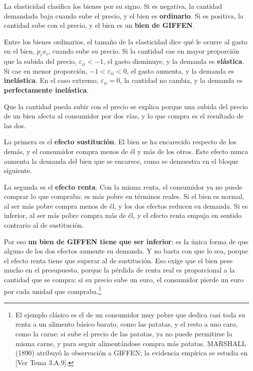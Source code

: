 \documentclass[10pt,a4paper]{article}
\newcommand{\authorfont}[1]{{\fontfamily{EBGaramond-TLF}\selectfont #1}}
\begin{document}
La elasticidad clasifica los bienes por su signo. Si es negativa, la cantidad demandada baja cuando sube el precio, y el bien es \textbf{ordinario}. Si es positiva, la cantidad sube con el precio, y el bien es un \textbf{bien de GIFFEN}.

Entre los bienes ordinarios, el tamaño de la elasticidad dice qué le ocurre al gasto en el bien, $p_ix_i$, cuando sube su precio. Si la cantidad cae en mayor proporción que la subida del precio, $\varepsilon_{ii}<-1$, el gasto disminuye, y la demanda es \textbf{elástica}. Si cae en menor proporción, $-1<\varepsilon_{ii}<0$, el gasto aumenta, y la demanda es \textbf{inelástica}. En el caso extremo, $\varepsilon_{ii}=0$, la cantidad no cambia, y la demanda es \textbf{perfectamente inelástica}.

Que la cantidad pueda subir con el precio se explica porque una subida del precio de un bien afecta al consumidor por dos vías, y lo que compra es el resultado de las dos.

La primera es el \textbf{efecto sustitución}. El bien se ha encarecido respecto de los demás, y el consumidor compra menos de él y más de los otros. Este efecto nunca aumenta la demanda del bien que se encarece, como se demuestra en el bloque siguiente.

La segunda es el \textbf{efecto renta}. Con la misma renta, el consumidor ya no puede comprar lo que compraba: es más pobre en términos reales. Si el bien es normal, al ser más pobre compra menos de él, y los dos efectos reducen su demanda. Si es inferior, al ser más pobre compra más de él, y el efecto renta empuja en sentido contrario al de sustitución.

Por eso \textbf{un bien de GIFFEN tiene que ser inferior}: es la única forma de que alguno de los dos efectos aumente su demanda. Y no basta con que lo sea, porque el efecto renta tiene que superar al de sustitución. Eso exige que el bien pese mucho en el presupuesto, porque la pérdida de renta real es proporcional a la cantidad que se compra: si su precio sube un euro, el consumidor pierde un euro por cada unidad que compraba.\footnote{%
    El ejemplo clásico es el de un consumidor muy pobre que dedica casi toda su renta a un alimento básico barato, como las patatas, y el resto a uno caro, como la carne: si sube el precio de las patatas, ya no puede permitirse la misma carne, y para seguir alimentándose compra más patatas. MARSHALL (1890) atribuyó la observación a GIFFEN; la evidencia empírica se estudia en [\authorfont{Ver Tema 3.A.9}].
}
\end{document}
